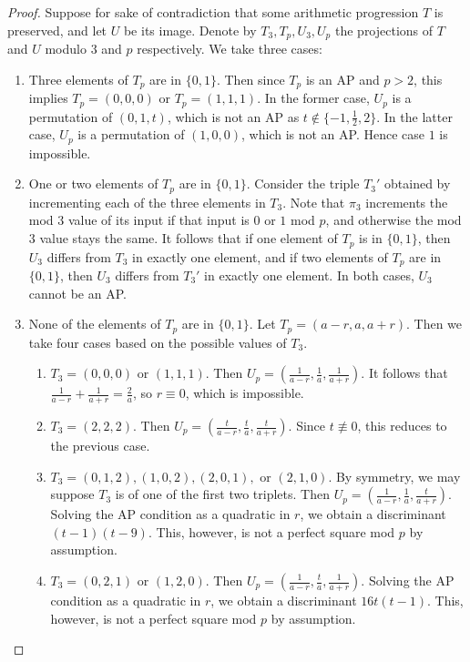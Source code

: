 \documentclass[12pt]{amsart}
\theoremstyle{definition}
\theoremstyle{remark}
\begin{document}
\begin{proof}
Suppose for sake of contradiction that some arithmetic progression $T$ is preserved, and let $U$ be its image. Denote by $T_3, T_p, U_3, U_p$ the projections of $T$ and $U$ modulo $3$ and $p$ respectively. We take three cases:
\begin{enumerate}
\item Three elements of $T_p$ are in $\{0, 1\}$. Then since $T_p$ is an AP and $p>2$, this implies $T_p=(0, 0, 0)$ or $T_p=(1, 1, 1)$. In the former case, $U_p$ is a permutation of $(0, 1, t)$, which is not an AP as $t\notin\{-1, \frac{1}{2}, 2\}$. In the latter case, $U_p$ is a permutation of $(1, 0, 0)$, which is not an AP. Hence case $1$ is impossible.
\item One or two elements of $T_p$ are in $\{0, 1\}$. Consider the triple $T_3'$ obtained by incrementing each of the three elements in $T_3$. Note that $\pi_3$ increments the mod $3$ value of its input if that input is $0$ or $1$ mod $p$, and otherwise the mod $3$ value stays the same. It follows that if one element of $T_p$ is in $\{0, 1\}$, then $U_3$ differs from $T_3$ in exactly one element, and if two elements of $T_p$ are in $\{0, 1\}$, then $U_3$ differs from $T_3'$ in exactly one element. In both cases, $U_3$ cannot be an AP.
\item None of the elements of $T_p$ are in $\{0, 1\}$. Let $T_p=(a-r, a, a+r)$. Then we take four cases based on the possible values of $T_3$.
\begin{enumerate}
\item $T_3=(0, 0, 0)$ or $(1, 1, 1)$. Then $U_p=(\frac{1}{a-r}, \frac{1}{a}, \frac{1}{a+r})$. It follows that $\frac{1}{a-r}+\frac{1}{a+r}=\frac{2}{a}$, so $r\equiv 0$, which is impossible.
\item $T_3=(2, 2, 2)$. Then $U_p=(\frac{t}{a-r}, \frac{t}{a}, \frac{t}{a+r})$. Since $t\nequiv 0$, this reduces to the previous case.
\item $T_3=(0, 1, 2), (1, 0, 2), (2, 0, 1),$ or $(2, 1, 0)$. By symmetry, we may suppose $T_3$ is of one of the first two triplets. Then $U_p=(\frac{1}{a-r}, \frac{1}{a}, \frac{t}{a+r})$. Solving the AP condition as a quadratic in $r$, we obtain a discriminant $(t-1)(t-9)$. This, however, is not a perfect square mod $p$ by assumption. 
\item $T_3=(0, 2, 1)$ or $(1, 2, 0)$. Then $U_p=(\frac{1}{a-r}, \frac{t}{a}, \frac{1}{a+r})$. Solving the AP condition as a quadratic in $r$, we obtain a discriminant $16t(t-1)$. This, however, is not a perfect square mod $p$ by assumption. 
\end{enumerate}
\end{enumerate}
\end{proof}
\end{document}
